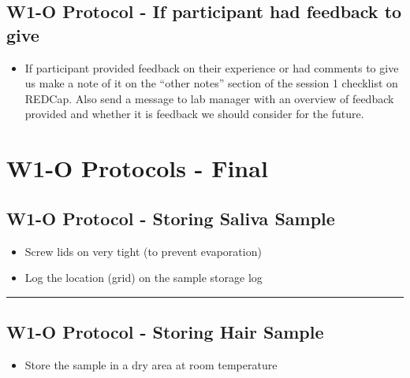 \documentclass[
]{book}
\providecommand{\tightlist}{%
  \setlength{\itemsep}{0pt}\setlength{\parskip}{0pt}}
\begin{document}
\hypertarget{w1-o-protocol---if-participant-had-feedback-to-give}{%
\subsection{W1-O Protocol - If participant had feedback to give}\label{w1-o-protocol---if-participant-had-feedback-to-give}}

\begin{itemize}
\tightlist
\item
  If participant provided feedback on their experience or had comments to give us make a note of it on the ``other notes'' section of the session 1 checklist on REDCap. Also send a message to lab manager with an overview of feedback provided and whether it is feedback we should consider for the future.
\end{itemize}

\hypertarget{w1-o-protocols---final}{%
\section{W1-O Protocols - Final}\label{w1-o-protocols---final}}

\hypertarget{w1-o-protocol---storing-saliva-sample}{%
\subsection{W1-O Protocol - Storing Saliva Sample}\label{w1-o-protocol---storing-saliva-sample}}

\begin{itemize}
\tightlist
\item
  Screw lids on very tight (to prevent evaporation)
\item
  Log the location (grid) on the sample storage log
\end{itemize}

\begin{center}\rule{0.5\linewidth}{0.5pt}\end{center}

\hypertarget{w1-o-protocol---storing-hair-sample}{%
\subsection{W1-O Protocol - Storing Hair Sample}\label{w1-o-protocol---storing-hair-sample}}

\begin{itemize}
\tightlist
\item
  Store the sample in a dry area at room temperature
\end{itemize}
\end{document}
